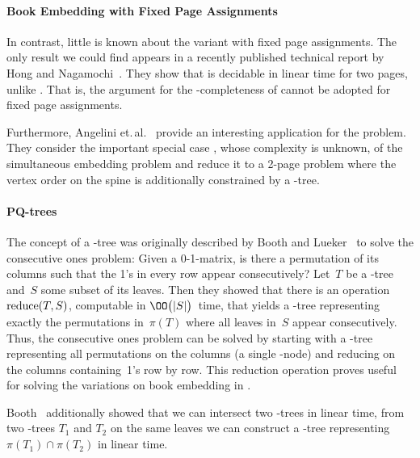 \paragraph{Book Embedding with Fixed Page Assignments}

In contrast, little is known about the variant \probBook with fixed page assignments. The only result we could find appears
in a recently published technical report by Hong and Nagamochi~\cite{two-page-09}. They show
that \probBook is decidable in linear time for two pages, unlike \probBookNormal. That is, the argument for the \NP-completeness of \probBookNormal
cannot be adopted for fixed page assignments. 

Furthermore, Angelini et.\,al.~\cite{angelini11} provide an interesting application for the
\probBook problem. They consider the important special case \SEFECON, whose complexity is unknown, of the simultaneous embedding problem \SEFE and reduce it to a 2-page \probBook problem where
the vertex order on the spine is additionally constrained by a \PT-tree.



\paragraph{PQ-trees}
The concept of a \PQ-tree was originally described by Booth and Lueker~\cite{Booth76} to solve
the consecutive ones problem: Given a 0-1-matrix, is there a permutation of its columns
such that the 1's in every row appear consecutively? Let~$T$ be a \PQ-tree and~$S$ some
subset of its leaves. Then they showed that there is an operation $\operatorname{reduce}(T, S)$, computable
in $\OO\bigl(|S|\bigr)$~time, that
yields a \PQ-tree representing exactly the permutations in~$\pi(T)$ where all leaves in~$S$ appear
consecutively. Thus, the consecutive ones problem can be solved by starting
with a \PQ-tree representing all permutations on the columns (a single \PT-node) and reducing on the columns containing~1's row by row. This reduction operation proves useful for solving the variations on
book embedding in . 

Booth~\cite{Booth75} additionally showed that we can intersect two \PQ-trees in linear
time, \ie from two \PQ-trees $T_1$ and $T_2$ on the same leaves we can construct a \PQ-tree representing~$\pi(T_1) \cap \pi(T_2)$ in linear time.

